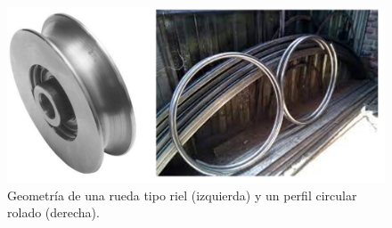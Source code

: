 \begin{figure}[H]
	\centering
	\includegraphics[width=\columnwidth]{imagenes/ruedaRielPistaCircular.PNG}
	\caption{Geometría de una rueda tipo riel (izquierda) y un perfil circular rolado (derecha).}
	\label{fig:rueda_pista}
\end{figure}





\endinput 
